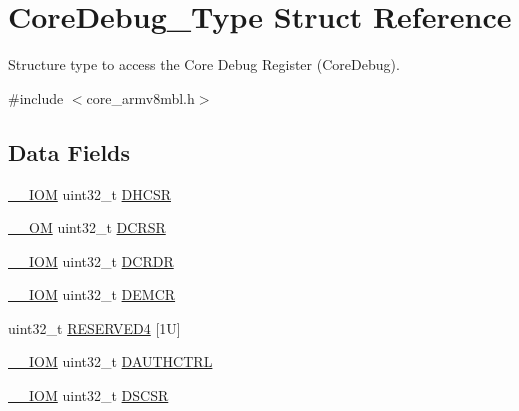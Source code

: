 \hypertarget{struct_core_debug___type}{}\section{Core\+Debug\+\_\+\+Type Struct Reference}
\label{struct_core_debug___type}


Structure type to access the Core Debug Register (Core\+Debug).  




{\ttfamily \#include $<$core\+\_\+armv8mbl.\+h$>$}

\subsection*{Data Fields}
\begin{DoxyCompactItemize}
\item 
\mbox{\hyperlink{core__cm4_8h_ab6caba5853a60a17e8e04499b52bf691}{\+\_\+\+\_\+\+I\+OM}} uint32\+\_\+t \mbox{\hyperlink{struct_core_debug___type_a94ca828091a9226ab6684fbf30e52909}{D\+H\+C\+SR}}
\item 
\mbox{\hyperlink{core__cm4_8h_a0ea2009ed8fd9ef35b48708280fdb758}{\+\_\+\+\_\+\+OM}} uint32\+\_\+t \mbox{\hyperlink{struct_core_debug___type_ab74a9ec90ad18e4f7a20362d362b754a}{D\+C\+R\+SR}}
\item 
\mbox{\hyperlink{core__cm4_8h_ab6caba5853a60a17e8e04499b52bf691}{\+\_\+\+\_\+\+I\+OM}} uint32\+\_\+t \mbox{\hyperlink{struct_core_debug___type_ad1dbd0dd98b6d9327f70545e0081ddbf}{D\+C\+R\+DR}}
\item 
\mbox{\hyperlink{core__cm4_8h_ab6caba5853a60a17e8e04499b52bf691}{\+\_\+\+\_\+\+I\+OM}} uint32\+\_\+t \mbox{\hyperlink{struct_core_debug___type_aa99de5f8c609f10c25ed51f57b2edd74}{D\+E\+M\+CR}}
\item 
uint32\+\_\+t \mbox{\hyperlink{struct_core_debug___type_a1defe18fe95571e383d754b13d3f6c51}{R\+E\+S\+E\+R\+V\+E\+D4}} \mbox{[}1\+U\mbox{]}
\item 
\mbox{\hyperlink{core__cm4_8h_ab6caba5853a60a17e8e04499b52bf691}{\+\_\+\+\_\+\+I\+OM}} uint32\+\_\+t \mbox{\hyperlink{struct_core_debug___type_a65047e5b8051fa0c84200f8229a155b3}{D\+A\+U\+T\+H\+C\+T\+RL}}
\item 
\mbox{\hyperlink{core__cm4_8h_ab6caba5853a60a17e8e04499b52bf691}{\+\_\+\+\_\+\+I\+OM}} uint32\+\_\+t \mbox{\hyperlink{struct_core_debug___type_a2916e1173ded6e0fc26e8445e72a6087}{D\+S\+C\+SR}}
\end{DoxyCompactItemize}


